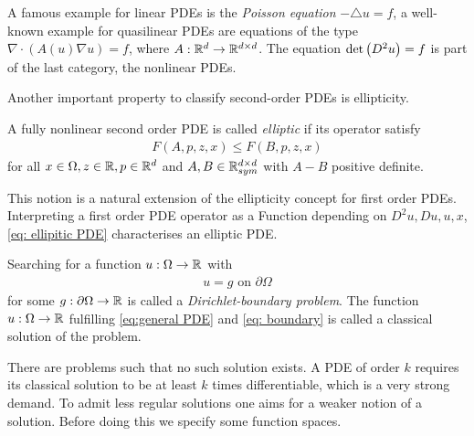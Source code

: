 A famous example for linear PDEs is the \emph{Poisson equation} $-\triangle u = f$,
a well-known example for quasilinear PDEs are equations of the type $\nabla \cdot (A(u) \nabla u) = f$, where $A: \mathbb{R}^d \rightarrow \mathbb{R}^{d \times d}  $. The \MA equation $\det{\left(D^2 u\right)} = f$ is part of the last category, the nonlinear PDEs. 

Another important property to classify second-order PDEs is ellipticity. 
\begin{definition}
	A fully nonlinear second order PDE is called \emph{elliptic} if its operator satisfy
	\begin{align}
		F(A,p,z,x) \leq F(B,p,z,x) \label{eq: ellipitic PDE}
	\end{align}
for all $x \in \Omega, z \in \mathbb{R}, p \in \mathbb{R}^d$ and $A,B \in \mathbb{R}^{d \times d}_{sym}$  with $A-B$ positive definite.

This notion is a natural extension of the ellipticity concept for first order PDEs. Interpreting a first order PDE operator as a Function depending on $D^2u, Du, u, x$, \eqref{eq: ellipitic PDE} characterises an elliptic PDE.
\end{definition}

Searching for a function $u:\Omega \rightarrow \mathbb{R}$ with 
\begin{align}
u=g \text{ on } \partial \Omega \label{eq: boundary}
\end{align}
for some $g:\partial \Omega \rightarrow \mathbb{R}$ is called a \emph{Dirichlet-boundary problem}. The function $u:\Omega \rightarrow \mathbb{R}$ fulfilling \eqref{eq:general PDE} and \eqref{eq: boundary} is called a classical solution of the problem. 

There are problems such that no such solution exists. A PDE of order $k$ requires its classical solution to be at least $k$ times differentiable, which is a very strong demand. To admit less regular solutions one aims for a weaker notion of a solution. Before doing this we specify some function spaces.

